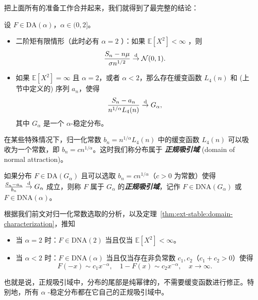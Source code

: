 把上面所有的准备工作合并起来，我们就得到了最完整的结论：

\begin{theorem}[广义中心极限定理]
\label{thm:ext-stable:gclt}

设 $F \in \mathrm{DA}(\alpha)$，$\alpha \in (0,2]$。

\begin{itemize}
\tightlist
\item
  二阶矩有限情形（此时必有 $\alpha=2$ ）：如果 $\mathbb{E}[X^2]<\infty$ ，则
  \[
  \frac{S_n - n\mu }{\sigma n^{1/2}} \overset{\rm d}\to \mathcal N(0,1).
  \]
\item
  如果 $\mathbb E[X^2] = \infty$ 且 $\alpha = 2$，或者 $\alpha < 2$，那么存在缓变函数 $L_4(n)$ 和 (上节中定义的) 序列 $a_n$，使得
  \[
  \frac{S_n-a_n}{n^{1/\alpha}L_4(n)}\overset{\rm d}\to G_\alpha,
  \]
  其中 $G_\alpha$ 是一个 $\alpha$-稳定分布。
\end{itemize}

\end{theorem}

在某些特殊情况下，归一化常数 $b_n=n^{1/\alpha}L_4(n)$ 中的缓变函数 $L_4(n)$ 可以吸收为一个常数，即 $b_n = c n^{1/\alpha}$。这时我们称分布属于 \textbf{\emph{正规吸引域}} (domain of normal attraction)。

\begin{definition*}[正规吸引域]
如果分布 $F\in\mathrm{DA}(G_\alpha)$ 且可以选取 $b_n=cn^{1/\alpha}$（$c>0$ 为常数）使得 $\frac{S_n-a_n}{b_n}\overset{\rm d}\to G_\alpha$ 成立，则称 $F$ 属于 $G_\alpha$ 的\textbf{\emph{正规吸引域}}，记作 $F\in\mathrm{DNA}(G_\alpha)$ 或 $F\in\mathrm{DNA}(\alpha)$。
\end{definition*}

根据我们前文对归一化常数选取的分析，以及定理~\ref{thm:ext-stable:domain-characterization}，推知

\begin{theorem}[正规吸引域的刻画]
\label{thm:ext-stable:normal-domain-characterization}

\begin{itemize}
\tightlist
\item
  当 $\alpha = 2$ 时：$F \in \mathrm{DNA}(2)$ 当且仅当 $\mathbb E[X^2] < \infty$。
\item
  当 $\alpha < 2$ 时：$F \in \mathrm{DNA}(\alpha)$ 当且仅当存在非负常数 $c_1, c_2$（$c_1 + c_2 > 0$）使得
  \[
  F(-x) \sim c_1 x^{-\alpha}, \quad 1 - F(x) \sim c_2 x^{-\alpha}, \quad x \to \infty.
  \]
\end{itemize}

\end{theorem}

也就是说，正规吸引域中，分布的尾部是纯幂律的，不需要缓变函数进行修正。特别地，所有 $\alpha$ -稳定分布都在它自己的正规吸引域中。
 
